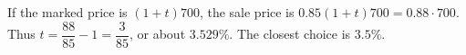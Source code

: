 If the marked price is $(1+t)700$, the sale price is $0.85(1+t)700=0.88\cdot700$. Thus $t=\dfrac{88}{85}-1=\dfrac{3}{85}$, or about $3.529\%$. The closest choice is $\boxed{3.5\%}$.
